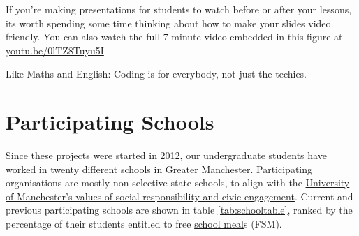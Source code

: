 \documentclass[
  12pt,
]{book}
\begin{document}
\label{fig:sonic-pi-fig}If you're making presentations for students to watch before or after your lessons, its worth spending some time thinking about how to make your slides video friendly. You can also watch the full 7 minute video embedded in this figure at \href{https://youtu.be/0lTZ8Tuyu5I}{youtu.be/0lTZ8Tuyu5I} \citep{youtube-sonicpi}



Like Maths and English: Coding is for everybody, not just the techies.

\section{Participating Schools}\label{schools}

Since these projects were started in 2012, our undergraduate students have worked in twenty different schools in Greater Manchester. Participating organisations are mostly non-selective state schools, to align with the \href{https://www.manchester.ac.uk/discover/vision/}{University of Manchester's values of social responsibility and civic engagement}. Current and previous participating schools are shown in table \ref{tab:schooltable}, ranked by the percentage of their students entitled to free \href{https://en.wikipedia.org/wiki/School_meal}{school meal}s (FSM).
\end{document}
